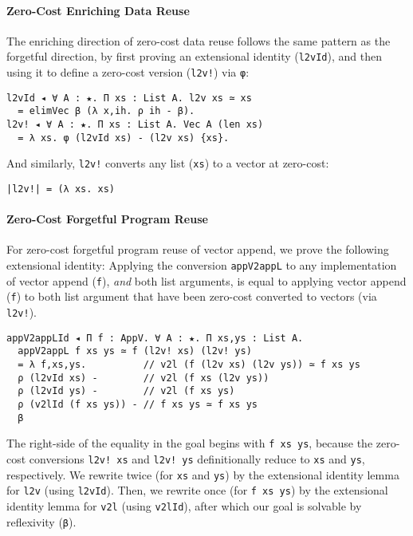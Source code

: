 \documentclass[acmsmall,screen]{acmart}
\begin{document}
\paragraph{Zero-Cost Enriching Data Reuse}

The enriching direction of zero-cost data reuse follows the same
pattern as the forgetful direction, by first proving an extensional identity
(\verb;l2vId;), and then using it to define a zero-cost version
(\verb;l2v!;) via \verb;φ;:
\begin{verbatim}
l2vId ◂ ∀ A : ★. Π xs : List A. l2v xs ≃ xs 
  = elimVec β (λ x,ih. ρ ih - β).
l2v! ◂ ∀ A : ★. Π xs : List A. Vec A (len xs)
  = λ xs. φ (l2vId xs) - (l2v xs) {xs}.
\end{verbatim}
And similarly, \verb;l2v!; converts any list (\verb;xs;)
to a vector at zero-cost:
\begin{verbatim}
|l2v!| = (λ xs. xs)
\end{verbatim}

\paragraph{Zero-Cost Forgetful Program Reuse}

For zero-cost forgetful program reuse of vector append, we prove
the following extensional identity:
Applying the conversion \verb;appV2appL; to any implementation of
vector append (\verb;f;), \textit{and} both list arguments, is equal
to applying vector append (\verb;f;) to both list argument that have been
zero-cost converted to vectors (via \verb;l2v!;).
\begin{verbatim}
appV2appLId ◂ Π f : AppV. ∀ A : ★. Π xs,ys : List A. 
  appV2appL f xs ys ≃ f (l2v! xs) (l2v! ys)
  = λ f,xs,ys.          // v2l (f (l2v xs) (l2v ys)) ≃ f xs ys
  ρ (l2vId xs) -        // v2l (f xs (l2v ys))
  ρ (l2vId ys) -        // v2l (f xs ys)
  ρ (v2lId (f xs ys)) - // f xs ys ≃ f xs ys
  β
\end{verbatim}
The right-side of the equality in the goal begins with
\verb;f xs ys;, because the zero-cost conversions \verb;l2v! xs; and
\verb;l2v! ys; definitionally reduce to \verb;xs; and \verb;ys;,
respectively. We rewrite twice (for \verb;xs; and \verb;ys;)
by the extensional identity lemma for \verb;l2v; (using \verb;l2vId;).
Then, we rewrite once (for \verb;f xs ys;) by the extensional identity
lemma for \verb;v2l; (using \verb;v2lId;), after which our goal is
solvable by reflexivity (\verb;β;).
\end{document}
